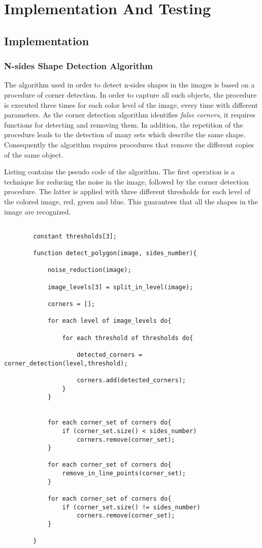 \chapter{Implementation And Testing}\label{impl_test}
	
	\section{Implementation}
	
		\subsection{N-sides Shape Detection Algorithm}
		The algorithm used in order to detect n-sides shapes in the images is based on a procedure of corner detection. 
		In order to capture all such objects, the procedure is executed three times for each color level of the image, every time with different parameters.
		As the corner detection algorithm identifies \emph{false corners}, it requires functions for detecting and removing them. 
		In addition, the repetition of the procedure leads to the detection of many sets which describe the same shape.	
		Consequently the algorithm requires procedures that remove the different copies of the same object.


		
		Listing \todo{} contains the pseudo code of the algorithm.
		The first operation is a technique for reducing the noise in the image, followed by the corner detection procedure.
		The latter is applied with three different thresholds for each level of the colored image, red, green and blue.
		This guarantees that all the shapes in the image are recognized.
		
		\begin{lstlisting}

		constant thresholds[3];	

		function detect_polygon(image, sides_number){

			noise_reduction(image);
			
			image_levels[3] = split_in_level(image);
			
			corners = [];
		
			for each level of image_levels do{
				
				for each threshold of thresholds do{

					detected_corners = corner_detection(level,threshold);

					corners.add(detected_corners);
				}
			}	

			
			for each corner_set of corners do{
				if (corner_set.size() < sides_number)
					corners.remove(corner_set);
			}			

			for each corner_set of corners do{
				remove_in_line_points(corner_set);
			}

			for each corner_set of corners do{
				if (corner_set.size() != sides_number)
					corners.remove(corner_set);
			}	
			
		}
		\end{lstlisting}
	

